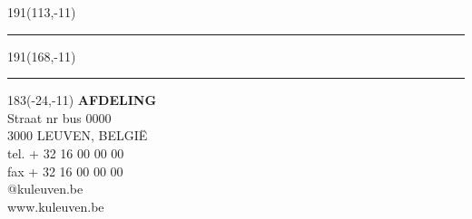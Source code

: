 \documentclass[12pt,a4paper,oneside]{book}
\begin{document}
\clearpage
{}
\listoffigures

\clearpage
{}
\listoftables

\clearpage
{}
\printindex

\clearpage
{}
\appendix






\newpage
\thispagestyle{empty}
\sffamily
%
\begin{textblock}{191}(113,-11)
{\color{blueline}\rule{160pt}{5.5pt}}
\end{textblock}
%
\begin{textblock}{191}(168,-11)
{\color{blueline}\rule{5.5pt}{59pt}}
\end{textblock}
%
\begin{textblock}{183}(-24,-11)
\textblockcolour{}
\flushright
\fontsize{7}{7.5}\selectfont
\textbf{AFDELING}\\
Straat nr bus 0000\\
3000 LEUVEN, BELGI\"{E}\\
tel. + 32 16 00 00 00\\
fax + 32 16 00 00 00\\
@kuleuven.be\\
www.kuleuven.be\\
\end{textblock}
%
\end{document}
